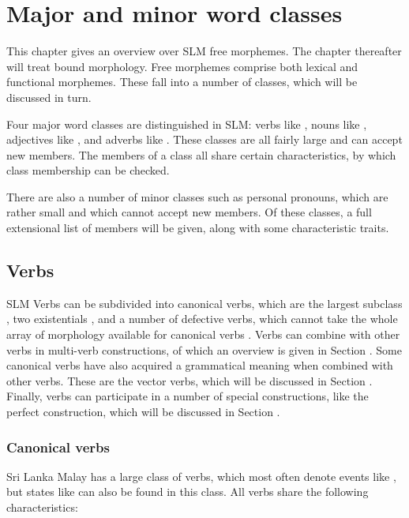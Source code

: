 \chapter{Major and minor word classes}\label{sec:form:freemorphemes}
\glossSTDmode
This chapter gives an overview over SLM free morphemes.  The chapter thereafter will treat bound morphology. Free morphemes comprise both lexical and functional morphemes. These fall into a number of classes, which will be discussed in turn.

Four major word classes are distinguished in SLM:
verbs like  ,
nouns like  ,
adjectives like  ,
and adverbs like  . These classes are all fairly large and can accept new members. The members of a class all share certain characteristics, by which class membership can be checked.

There are also a number of minor classes such as personal pronouns, which are rather small and which cannot accept new members. Of these classes, a full extensional list of members will be given, along with some characteristic traits.

\section{Verbs}\label{sec:wc:Verbs}
SLM Verbs can be subdivided into canonical verbs, which are the largest subclass , two existentials , and a number of defective verbs, which cannot take the whole array of morphology available for canonical verbs . Verbs can combine with other verbs in multi-verb constructions, of which an overview is given in Section .  Some canonical verbs have also acquired a grammatical meaning when combined with other verbs. These are the vector verbs, which will be discussed in Section . Finally, verbs can participate in a number of special constructions, like the perfect construction, which will be discussed in Section .

\subsection{Canonical verbs}\label{sec:wc:Canonicalverbs}
Sri Lanka Malay has a large class of verbs, which most often denote events like , but  states like  can also be found in this class. All verbs share the following characteristics:


